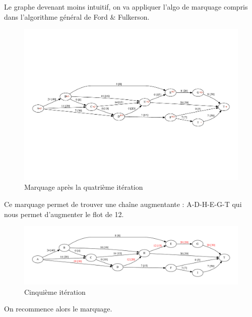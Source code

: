 \documentclass[paper=a4, fontsize=11pt]{scrartcl} %
\numberwithin{equation}{section} %
\numberwithin{figure}{section} %
\numberwithin{table}{section} %
\begin{document}
Le graphe devenant moins intuitif, on va appliquer l'algo de marquage compris dans l'algorithme général de Ford \& Fulkerson.

\begin{figure}[h]
\begin{center}
	\includegraphics[width=\textwidth]{figs/reseau-4m.pdf}
	\caption{Marquage après la quatrième itération}
	\label{fig:res:4m}
\end{center}
\end{figure}

Ce marquage permet de trouver une chaîne augmentante : A-D-H-E-G-T qui nous permet d'augmenter le flot de 12.

\begin{figure}[h]
\begin{center}
	\includegraphics[width=\textwidth]{figs/reseau-5.pdf}
	\caption{Cinquième itération}
	\label{fig:res:5}
\end{center}
\end{figure}

On recommence alors le marquage. 
\end{document}
